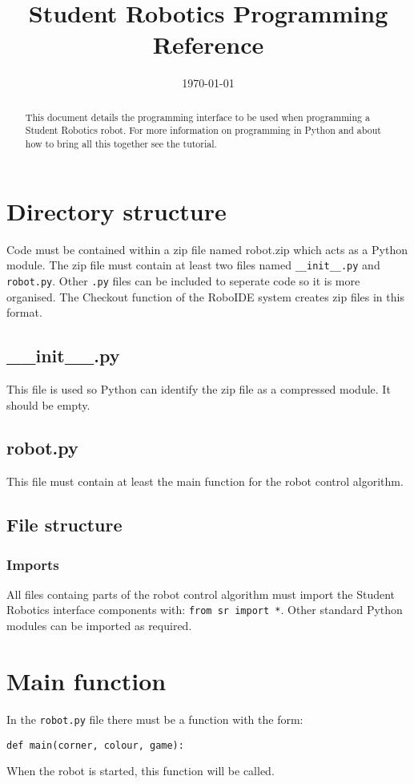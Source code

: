\documentclass{article}
\begin{document}
\title{Student Robotics Programming Reference}
\date{\today}
\maketitle
\begin{abstract}
This document details the programming interface to be used when programming a
Student Robotics robot.  For more information on programming in Python and
about how to bring all this together see the tutorial.
\end{abstract}
\section{Directory structure}
Code must be contained within a zip file named robot.zip which acts as a Python
module.  The zip file must contain at least two files named
\texttt{__init__.py} and \texttt{robot.py}.  Other \texttt{.py} files can be
included to seperate code so it is more organised.  The Checkout function of
the RoboIDE system creates zip files in this format.
\subsection{__init__.py}
This file is used so Python can identify the zip file as a compressed module.
It should be empty.
\subsection{robot.py}
This file must contain at least the main function for the robot control
algorithm.
\subsection{File structure}
\subsubsection{Imports}
All files containg parts of the robot control algorithm must import the Student
Robotics interface components with: \texttt{from sr import *}.  Other standard
Python modules can be imported as required.
\section{Main function}
In the \texttt{robot.py} file there must be a function with the form:

\texttt{def main(corner, colour, game):}

When the robot is started, this function will be called.
\end{document}
